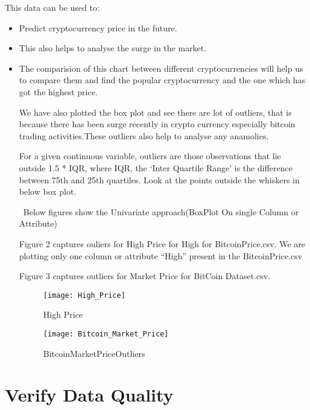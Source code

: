 \documentclass{article}
\begin{document}
This data can be used to:
\begin{itemize}
\item Predict cryptocurrency price in the future.

\item This also helps to analyse the surge in the market.

\item The comparision of this chart between different cryptocurrencies will help us to compare them and find the popular cryptocurrency and the one which has got the highest price.

We have also plotted the box plot and see there are lot of outliers, that is because there has been surge recently in crypto currency especially bitcoin trading activities.These outliers also help to analyse any anamolies. 

For a given continuous variable, outliers are those observations that lie outside 1.5 * IQR, where IQR, the ‘Inter Quartile Range’ is the difference between 75th and 25th quartiles. Look at the points outside the whiskers in below box plot.

\ Below figures show the Univariate approach(BoxPlot On single Column or Attribute)

Figure 2 captures ouliers for High Price for High for BitcoinPrice.csv. We are plotting only one column or attribute “High” present in the BitcoinPrice.csv

Figure 3 captures outliers for Market Price for BitCoin Dataset.csv.




\begin{figure}
    \centering
    \texttt{[image: High\_Price]}
    \caption{High \textunderscore Price}
    \label{fig:my_label}
\end{figure}




\begin{figure}
    \centering
    \texttt{[image: Bitcoin\_Market\_Price]}
    \caption{Bitcoin\textunderscore Market\textunderscore Price\textunderscore Outliers}
    \label{fig:my_label}
\end{figure}

\end{itemize}


\section{Verify Data Quality}
\end{document}
